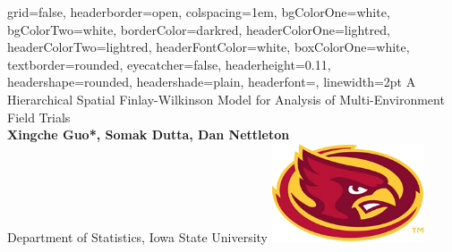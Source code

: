\documentclass[a0paper,portrait]{baposter}
\begin{document}







\begin{poster}
{
grid=false,
headerborder=open, %
colspacing=1em, %
bgColorOne=white, %
bgColorTwo=white, %
borderColor=darkred, %
headerColorOne=lightred, %
headerColorTwo=lightred, %
headerFontColor=white, %
boxColorOne=white, %
textborder=rounded, %
eyecatcher=false, %
headerheight=0.11\textheight, %
headershape=rounded, %
headershade=plain,
headerfont=\Large\textsf, %
linewidth=2pt %
}
{}
%
%
{\textsf %
{A Hierarchical Spatial Finlay-Wilkinson Model for Analysis of Multi-Environment Field Trials
}
} 
{\sf\vspace{0.5em}\\
\textbf{Xingche Guo*, Somak Dutta, Dan Nettleton}
\vspace{0.1em}\\
Department of Statistics, Iowa State University
}
{\includegraphics[width=45mm]{isu_logo.jpg}} %




\end{poster}
\end{document}
